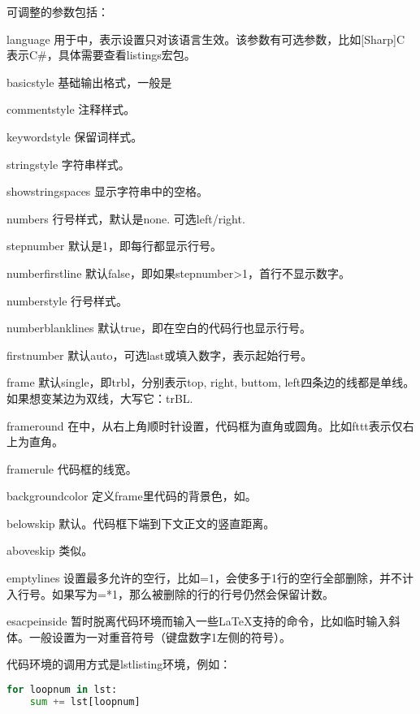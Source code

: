 可调整的参数包括：
\begin{para}
\item[language] 用于\latexline{\\lstset}中，表示设置只对该语言生效。该参数有可选参数，比如[Sharp]C表示C\#，具体需要查看listings宏包。
\item[basicstyle] 基础输出格式，一般是\latexline{\\small\\ttfamily}
\item[commentstyle] 注释样式。
\item[keywordstyle] 保留词样式。
\item[stringstyle] 字符串样式。
\item[showstringspaces] 显示字符串中的空格。
\item[numbers] 行号样式，默认是none. 可选left/right. 
\item[stepnumber] 默认是1，即每行都显示行号。
\item[numberfirstline] 默认false，即如果stepnumber>1，首行不显示数字。
\item[numberstyle] 行号样式。
\item[numberblanklines] 默认true，即在空白的代码行也显示行号。
\item[firstnumber] 默认auto，可选last或填入数字，表示起始行号。
\item[frame] 默认single，即trbl，分别表示top, right, buttom, left四条边的线都是单线。如果想变某边为双线，大写它：trBL. 
\item[frameround] 在\latexline{\\lstset}中，从右上角顺时针设置，代码框为直角或圆角。比如fttt表示仅右上为直角。
\item[framerule] 代码框的线宽。
\item[backgroundcolor] 定义frame里代码的背景色，如\latexline{\\color{red}}。
\item[belowskip] 默认\latexline{\\medskipamount}。代码框下端到下文正文的竖直距离。
\item[aboveskip] 类似。
\item[emptylines] 设置最多允许的空行，比如=1，会使多于1行的空行全部删除，并不计入行号。如果写为=*1，那么被删除的行的行号仍然会保留计数。
\item[esacpeinside] 暂时脱离代码环境而输入一些\LaTeX 支持的命令，比如临时输入斜体。一般设置为一对重音符号（键盘数字1左侧的符号）。
\end{para}

代码环境的调用方式是lstlisting环境，例如：
\begin{latex}{}
\begin{lstlisting}[language=Python]
for loopnum in lst:
    sum += lst[loopnum]
\end{lstlisting}
\end{latex}

